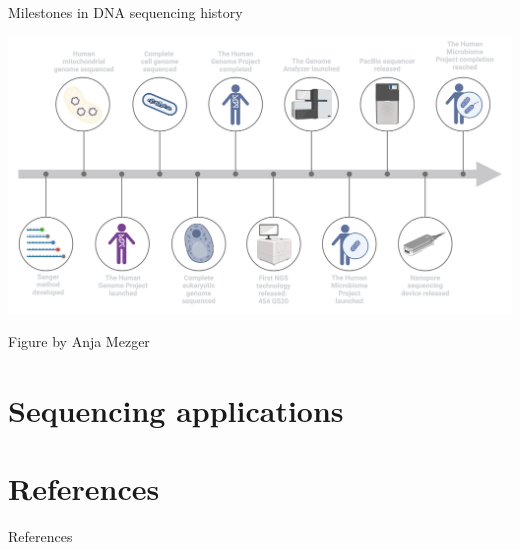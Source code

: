 \documentclass[10pt]{beamer}
\newcommand{\creditdark}[1]{{\vspace{\fill} \par \raggedleft \scriptsize \mdseries \color{scMGray} #1 \par}}
\begin{document}
\begin{frame}[standout]{Milestones in DNA sequencing history}
	\vspace*{-1.1cm}
	\begin{center}
		\hspace*{-1.1cm}
		\includegraphics[width=1.2\textwidth]{./figures/timeline.png}
	\end{center}
	\creditdark{Figure by Anja Mezger}
\end{frame}


\section{Sequencing applications}


\section{References}
\begin{frame}[allowframebreaks]{References}
\begingroup
\renewcommand*{\bibfont}{\footnotesize} 
\printbibliography[heading=none]
\endgroup
\end{frame}
\end{document}
